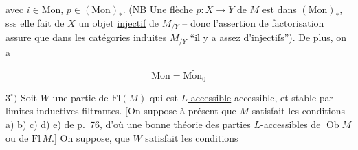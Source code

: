 avec $i\in\mathrm{Mon}$, $p\in(\mathrm{Mon})_*$. (\uline{NB} Une flèche $p\colon X\longrightarrow Y$ de $M$ est dans $(\mathrm{Mon})_*$, sss elle fait de $X$ un objet \uline{injectif} de $M_{/Y}$ -- donc l'assertion de factorisation assure que dans les catégories induites $M_{/Y}$ ``il y a assez d'injectifs''). De plus,  on a

\[
\mathrm{Mon}=\widetilde{\mathrm{Mon}_0}\tag*{(7.1.3)}
\]

$3^\circ)$ Soit $W$ une partie de $\mathrm{Fl}(M)$ qui est \uline{$L$-accessible}  accessible, et stable par limites inductives filtrantes. [On suppose à présent que $M$ satisfait les conditions a) b) c) d) e) de p.~76, d'où une bonne théorie des parties $L$-accessibles de $\operatorname{Ob}M$ ou de $\mathrm{Fl}\,M$.] On suppose,   que $W$ satisfait les conditions
